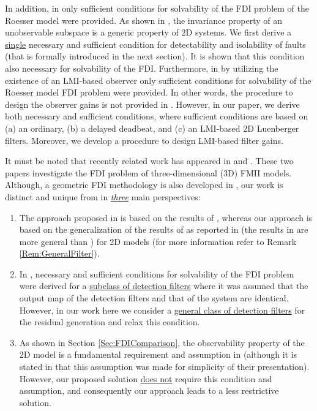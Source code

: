 \documentclass[journal,12pt,draftcls,onecolumn]{IEEEtran}
\begin{document}
In addition, in \cite{ACC2013} only sufficient conditions for solvability of the FDI problem of the Roesser model were provided. As shown in \cite{ACC2014}, the invariance property  of an unobservable subspace is a generic property of 2D systems. We first derive a \underline{single} necessary and sufficient condition for detectability and isolability of faults (that is formally introduced in the next section). It is shown that this condition also necessary for solvability of the FDI. Furthermore, in \cite{ACC2013} by utilizing the existence of an LMI-based observer  only sufficient conditions for solvability of the Roesser model FDI problem were provided. In other words, the procedure to design the observer gains is not provided in \cite{ACC2013,ACC2014}. However, in our paper, we derive both necessary and sufficient conditions, where sufficient conditions are based on  (a) an ordinary, (b) a delayed deadbeat, and (c) an LMI-based 2D Luenberger filters. Moreover,  we develop a procedure to design LMI-based filter gains. 

It must be noted that recently related work has appeared in \cite{Malek_3DFDI} and \cite{Malek_3DFDIConf}. These two papers investigate the FDI problem of three-dimensional (3D) FMII models. Although, a geometric FDI methodology is also developed in \cite{Malek_3DFDI}, our work is distinct and unique from \cite{Malek_3DFDI} in \underline{{\it three}} main perspectives:
\begin{enumerate}
	\item The approach proposed  in \cite{Malek_3DFDI} is based on the results of \cite{Massoumnia1986}, whereas our approach is based on the generalization of the results of \cite{Massoumnia1986} as reported in \cite{Massoumnia1989} (the results in \cite{Massoumnia1989} are more general than \cite{Massoumnia1986}) for 2D models (for more information refer to Remark \ref{Rem:GeneralFilter}).
	\item In \cite{Malek_3DFDI}, necessary and sufficient conditions for solvability of the FDI problem were derived for a \underline{subclass of detection filters} where it was assumed that the output map of the detection filters and that of the system are identical. However,  in our work here we consider a \underline{general class of detection filters} for the residual generation and relax this condition.
	\item As shown in Section \ref{Sec:FDIComparison}, the observability property of the 2D model is a fundamental requirement and assumption in \cite{Malek_3DFDI} (although it is stated in \cite{Malek_3DFDI} that this assumption was made  for simplicity of their presentation). However, our proposed solution \underline{does not} require this condition and assumption, and consequently our approach leads to a less restrictive solution.
\end{enumerate}
\end{document}
